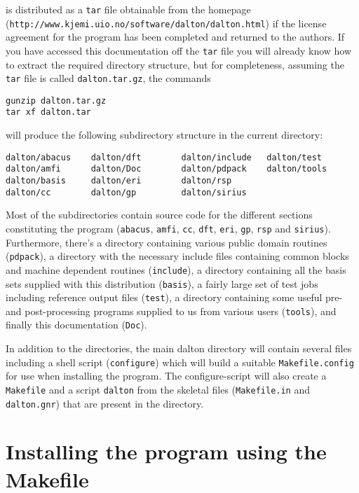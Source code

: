 {\dalton} is distributed as a \verb|tar| file obtainable from
the {\dalton} homepage\\
(\verb|http://www.kjemi.uio.no/software/dalton/dalton.html|) if the
license agreement for the program has been completed and returned to
the authors.  If you have accessed this documentation off the
\verb|tar| file you will
already know how to extract the required directory structure, but
for completeness, assuming the \verb|tar| file is called
\verb|dalton.tar.gz|, the commands
\begin{verbatim}
gunzip dalton.tar.gz
tar xf dalton.tar
\end{verbatim}
will produce the following subdirectory structure in the current
directory:
\begin{verbatim}
dalton/abacus    dalton/dft        dalton/include   dalton/test
dalton/amfi      dalton/Doc        dalton/pdpack    dalton/tools
dalton/basis     dalton/eri        dalton/rsp
dalton/cc        dalton/gp         dalton/sirius
\end{verbatim}
Most of the subdirectories contain source code for the different sections
constituting the program (\verb|abacus|, \verb|amfi|, \verb|cc|, \verb|dft|,
\verb|eri|, \verb|gp|, \verb|rsp| and \verb|sirius|). Furthermore,
there's a directory containing
various public domain routines (\verb|pdpack|), a directory with the
necessary include files containing common blocks and
machine dependent routines (\verb|include|), a directory containing
all the basis sets supplied with this distribution (\verb|basis|), a
fairly large set of test jobs including reference output files
(\verb|test|), a directory containing some useful pre- and
post-processing programs supplied to us from various users
(\verb|tools|), and finally this documentation (\verb|Doc|). 

In addition to the directories, the main dalton directory will
contain several files including a shell script (\verb|configure|)
which will build a suitable \verb|Makefile.config| for use when
installing the program. The configure-script will also create a
\verb|Makefile| and a script \verb|dalton| from the skeletal files
(\verb|Makefile.in| and \verb|dalton.gnr|) that are present in the
directory.


\section{Installing the program using the
Makefile}\label{sec:Makefile}

